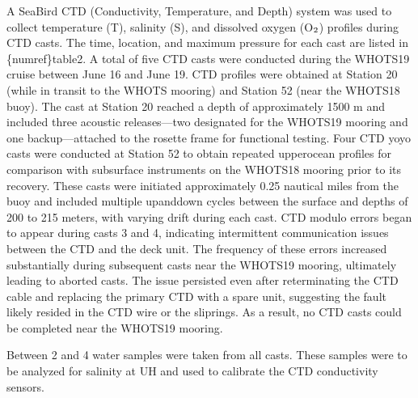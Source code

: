 \documentclass[a4paper,10pt,english,openany,oneside]{sphinxmanual}
\begin{document}
\sphinxAtStartPar
A Sea\sphinxhyphen{}Bird CTD (Conductivity, Temperature, and Depth) system was used to
collect temperature (T), salinity (S), and dissolved oxygen (O\(\sb{\text{2}}\)) profiles
during CTD casts. The time, location, and maximum pressure for each cast are
listed in \{numref\}table\sphinxhyphen{}2. A total of five CTD casts were conducted during the
WHOTS\sphinxhyphen{}19 cruise between June 16 and June 19. CTD profiles were obtained at
Station 20 (while in transit to the WHOTS mooring) and Station 52 (near the
WHOTS\sphinxhyphen{}18 buoy). The cast at Station 20 reached a depth of approximately 1500 m
and included three acoustic releases—two designated for the WHOTS\sphinxhyphen{}19 mooring
and one backup—attached to the rosette frame for functional testing. Four CTD
yo\sphinxhyphen{}yo casts were conducted at Station 52 to obtain repeated upper\sphinxhyphen{}ocean
profiles for comparison with subsurface instruments on the WHOTS\sphinxhyphen{}18 mooring
prior to its recovery. These casts were initiated approximately 0.25 nautical
miles from the buoy and included multiple up\sphinxhyphen{}and\sphinxhyphen{}down cycles between the
surface and depths of 200 to 215 meters, with varying drift during each cast.
CTD modulo errors began to appear during casts 3 and 4, indicating intermittent
communication issues between the CTD and the deck unit. The frequency of these
errors increased substantially during subsequent casts near the WHOTS\sphinxhyphen{}19
mooring, ultimately leading to aborted casts. The issue persisted even after
re\sphinxhyphen{}terminating the CTD cable and replacing the primary CTD with a spare unit,
suggesting the fault likely resided in the CTD wire or the slip\sphinxhyphen{}rings. As a
result, no CTD casts could be completed near the WHOTS\sphinxhyphen{}19 mooring.

\sphinxAtStartPar
Between 2 and 4 water samples were taken from all casts. These samples were to
be analyzed for salinity at UH and used to calibrate the CTD conductivity
sensors.
\end{document}
